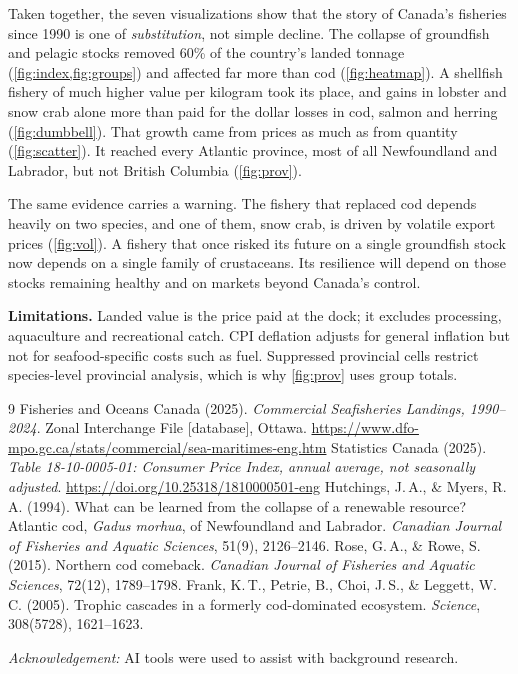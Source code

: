 \documentclass[12pt,letterpaper]{article}
\begin{document}
\vspace{-4pt}
Taken together, the seven visualizations show that the story of Canada's fisheries since 1990
is one of \emph{substitution}, not simple decline. The collapse of groundfish and pelagic stocks
removed 60\% of the country's landed tonnage (\cref{fig:index,fig:groups}) and affected far
more than cod (\cref{fig:heatmap}). A shellfish fishery of much higher value per kilogram took its
place, and gains in lobster and snow crab alone more than paid for the dollar losses in cod,
salmon and herring (\cref{fig:dumbbell}). That growth came from prices as much as from quantity
(\cref{fig:scatter}). It reached every Atlantic province, most of all Newfoundland and Labrador,
but not British Columbia (\cref{fig:prov}).

The same evidence carries a warning. The fishery that replaced cod depends heavily on two
species, and one of them, snow crab, is driven by volatile export prices (\cref{fig:vol}).
A fishery that once risked its future on a single groundfish stock now depends on a single
family of crustaceans. Its resilience will depend on those stocks remaining healthy and on
markets beyond Canada's control.

\textbf{Limitations.} Landed value is the price paid at the dock; it excludes processing,
aquaculture and recreational catch. CPI deflation adjusts for general inflation but not for
seafood-specific costs such as fuel. Suppressed provincial cells restrict species-level
provincial analysis, which is why \cref{fig:prov} uses group totals.

\vspace{-2pt}
\renewcommand{\refname}{\normalsize References}
{\small
\begin{thebibliography}{9}\setlength{\itemsep}{0pt}
 Fisheries and Oceans Canada (2025). \emph{Commercial Seafisheries Landings, 1990--2024}. Zonal Interchange File [database], Ottawa. \url{https://www.dfo-mpo.gc.ca/stats/commercial/sea-maritimes-eng.htm}
 Statistics Canada (2025). \emph{Table 18-10-0005-01: Consumer Price Index, annual average, not seasonally adjusted}. \url{https://doi.org/10.25318/1810000501-eng}
 Hutchings, J.\,A., \& Myers, R.\,A. (1994). What can be learned from the collapse of a renewable resource? Atlantic cod, \emph{Gadus morhua}, of Newfoundland and Labrador. \emph{Canadian Journal of Fisheries and Aquatic Sciences}, 51(9), 2126--2146.
 Rose, G.\,A., \& Rowe, S. (2015). Northern cod comeback. \emph{Canadian Journal of Fisheries and Aquatic Sciences}, 72(12), 1789--1798.
 Frank, K.\,T., Petrie, B., Choi, J.\,S., \& Leggett, W.\,C. (2005). Trophic cascades in a formerly cod-dominated ecosystem. \emph{Science}, 308(5728), 1621--1623.
\end{thebibliography}
\par\smallskip
\textit{Acknowledgement:} AI tools were used to assist with background research.\par
}
\end{document}
